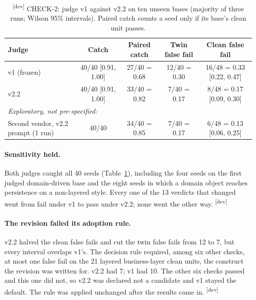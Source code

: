 \documentclass[10pt,a4paper]{article}
\newcommand{\devset}{\textsuperscript{\textsf{\tiny[dev]}}}
\begin{document}
\begin{table}[t]
\centering\small
\caption{\devset{} CHECK-2: judge v1 against v2.2 on ten unseen bases (majority of three runs; Wilson 95\%
intervals). Paired catch counts a seed only if its base's clean unit passes.}
\label{tab:check2}
\setlength{\tabcolsep}{4pt}
\begin{tabular}{@{}lcccc@{}}
\toprule
Judge & Catch & Paired catch & Twin false fail & Clean false fail \\
\midrule
v1 (frozen) & 40/40 [0.91, 1.00] & 27/40 = 0.68 & 12/40 = 0.30 & 16/48 = 0.33 [0.22, 0.47] \\
v2.2        & 40/40 [0.91, 1.00] & 33/40 = 0.82 & 7/40 = 0.17  & 8/48 = 0.17 [0.09, 0.30] \\
\midrule
\multicolumn{5}{l}{\emph{Exploratory, not pre-specified:}} \\
Second vendor, v2.2 prompt (1 run) & 40/40 & 34/40 = 0.85 & 7/40 = 0.17 & 6/48 = 0.13 [0.06, 0.25] \\
\bottomrule
\end{tabular}
\end{table}

\paragraph{Sensitivity held.} Both judges caught all 40 seeds (Table~\ref{tab:check2}), including the four seeds on
the first judged domain-driven base and the eight seeds in which a domain object reaches persistence on a
non-layered style. Every one of the 13 verdicts that changed went from fail under v1 to pass under v2.2; none went
the other way. \devset{}

\paragraph{The revision failed its adoption rule.} v2.2 halved the clean false fails and cut the twin false fails
from 12 to 7, but every interval overlaps v1's. The decision rule required, among six other checks, at most one false
fail on the 21 layered business-layer clean units, the construct the revision was written for. v2.2 had 7; v1 had
10. The other six checks passed and this one did not, so v2.2 was declared not a candidate and v1 stayed the default.
The rule was applied unchanged after the results came in. \devset{}
\end{document}
